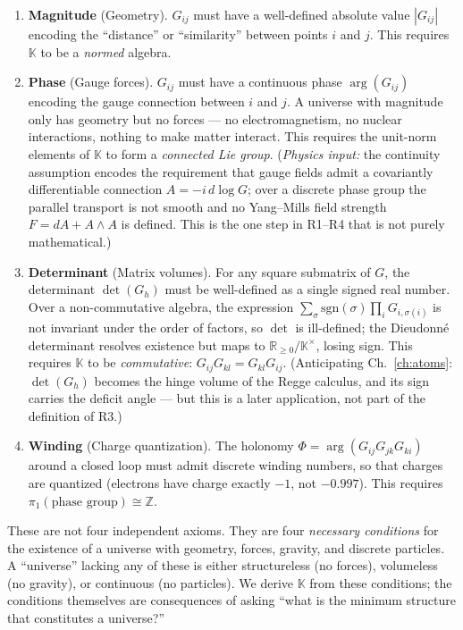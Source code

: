 \begin{enumerate}[label=\textbf{R\arabic*.}, leftmargin=2cm]
\item \textbf{Magnitude} (Geometry). $G_{ij}$ must have a well-defined absolute value $|G_{ij}|$ encoding the ``distance'' or ``similarity'' between points $i$ and $j$. This requires $\mathbb{K}$ to be a \emph{normed} algebra.

\item \textbf{Phase} (Gauge forces). $G_{ij}$ must have a continuous phase $\arg(G_{ij})$ encoding the gauge connection between $i$ and $j$. A universe with magnitude only has geometry but no forces --- no electromagnetism, no nuclear interactions, nothing to make matter interact. This requires the unit-norm elements of $\mathbb{K}$ to form a \emph{connected Lie group}.  (\emph{Physics input:} the continuity assumption encodes the requirement that gauge fields admit a covariantly differentiable connection $A = -i\,d\log G$; over a discrete phase group the parallel transport is not smooth and no Yang--Mills field strength $F = dA + A \wedge A$ is defined.  This is the one step in R1--R4 that is not purely mathematical.)

\item \textbf{Determinant} (Matrix volumes). For any square submatrix of $G$, the determinant $\det(G_h)$ must be well-defined as a single signed real number. Over a non-commutative algebra, the expression $\sum_\sigma \mathrm{sgn}(\sigma)\prod_i G_{i,\sigma(i)}$ is not invariant under the order of factors, so $\det$ is ill-defined; the Dieudonn\'e determinant resolves existence but maps to $\mathbb{R}_{\geq 0}/\mathbb{K}^\times$, losing sign. This requires $\mathbb{K}$ to be \emph{commutative}: $G_{ij} G_{kl} = G_{kl} G_{ij}$.  (Anticipating Ch.~\ref{ch:atoms}: $\det(G_h)$ becomes the hinge volume of the Regge calculus, and its sign carries the deficit angle — but this is a later application, not part of the definition of R3.)

\item \textbf{Winding} (Charge quantization). The holonomy $\Phi = \arg(G_{ij} G_{jk} G_{ki})$ around a closed loop must admit discrete winding numbers, so that charges are quantized (electrons have charge exactly $-1$, not $-0.997$). This requires $\pi_1(\text{phase group}) \cong \mathbb{Z}$.
\end{enumerate}

\begin{remark}
These are not four independent axioms. They are four \emph{necessary conditions} for the existence of a universe with geometry, forces, gravity, and discrete particles. A ``universe'' lacking any of these is either structureless (no forces), volumeless (no gravity), or continuous (no particles). We derive $\mathbb{K}$ from these conditions; the conditions themselves are consequences of asking ``what is the minimum structure that constitutes a universe?''
\end{remark}

